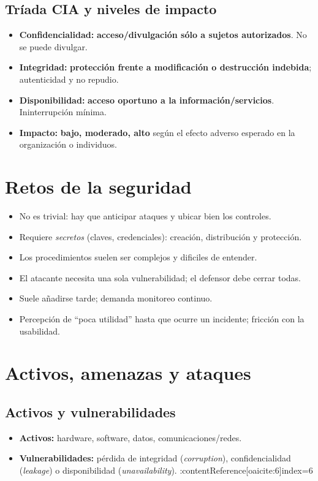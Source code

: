 \documentclass[11pt,a4paper]{article}
\begin{document}
    \subsection{Tríada CIA y niveles de impacto}
    \begin{itemize}
        \item \textbf{Confidencialidad:} \textbf{acceso/divulgación sólo a sujetos autorizados}. No se puede divulgar.
        \item \textbf{Integridad:} \textbf{protección frente a modificación o destrucción indebida}; autenticidad y no repudio.
        \item \textbf{Disponibilidad:} \textbf{acceso oportuno a la información/servicios}. Ininterrupción mínima.
        \item \textbf{Impacto:} \textbf{bajo, moderado, alto} según el efecto adverso esperado en la organización o individuos.
    \end{itemize}

    \section{Retos de la seguridad}
    \begin{itemize}
        \item No es trivial: hay que anticipar ataques y ubicar bien los controles.
        \item Requiere \textit{secretos} (claves, credenciales): creación, distribución y protección.
        \item Los procedimientos suelen ser complejos y dificiles de entender.
        \item El atacante necesita una sola vulnerabilidad; el defensor debe cerrar todas.
        \item Suele añadirse tarde; demanda monitoreo continuo.
        \item Percepción de “poca utilidad” hasta que ocurre un incidente; fricción con la usabilidad.
    \end{itemize}

    \section{Activos, amenazas y ataques}
    \subsection{Activos y vulnerabilidades}
    \begin{itemize}
        \item \textbf{Activos:} hardware, software, datos, comunicaciones/redes.
        \item \textbf{Vulnerabilidades:} pérdida de integridad (\textit{corruption}), confidencialidad (\textit{leakage}) o disponibilidad (\textit{unavailability}). :contentReference[oaicite:6]{index=6}
    \end{itemize}
\end{document}

